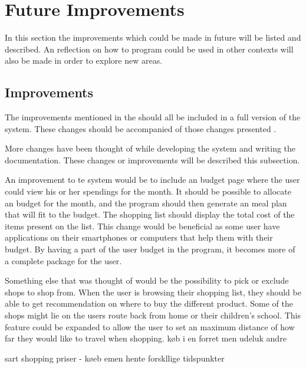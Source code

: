 \section{Future Improvements}
In this section the improvements which could be made in future will be listed and described. An reflection on how to program could be used in other contexts will also be made in order to explore new areas.

\subsection{Improvements}
The improvements mentioned in the  should all be included in a full version of the system. These changes should be accompanied of those changes presented .

More changes have been thought of while developing the system and writing the documentation. These changes or improvements will be described this subsection.

An improvement to te system would be to include an budget page where the user could view his or her spendings for the month. It should be possible to allocate an budget for the month, and the program should then generate an meal plan that will fit to the budget. The shopping list should display the total cost of the items present on the list. This change would be beneficial as some user have applications on their smartphones or computers that help them with their budget. By having a part of the user budget in the program, it becomes more of a complete package for the user.

Something else that was thought of would be the possibility to pick or exclude shops to shop from. When the user is browsing their shopping list, they should be able to get recommendation on where to buy the different product. Some of the shops might lie on the users route back from home or their children's school. This feature could be expanded to allow the user to set an maximum distance of how far they would like to travel when shopping.
køb i en forret men udeluk andre

sart shopping priser - køeb emen hente forskllige tidspunkter
 


